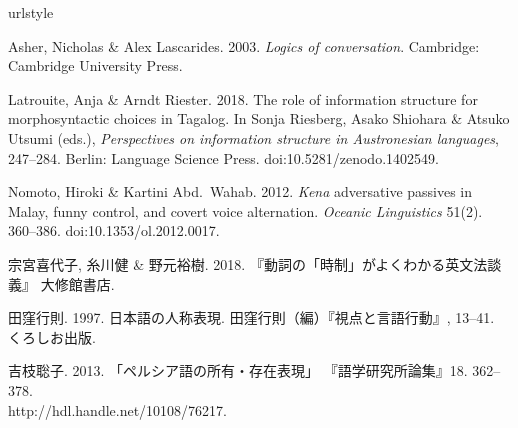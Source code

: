 \documentclass{goken}
\begin{document}
\begin{thebibliography}{6}
\providecommand{\natexlab}[1]{#1}
\providecommand{\url}[1]{#1}
\providecommand{\urlprefix}{}
\expandafter\ifx\csname urlstyle\endcsname\relax
  \providecommand{\doi}[1]{doi:\discretionary{}{}{}#1}\else
  \providecommand{\doi}{doi:\discretionary{}{}{}\begingroup
  \urlstyle{rm}\Url}\fi

Asher, Nicholas \& Alex Lascarides. 2003.
\newblock \emph{Logics of conversation}.
\newblock Cambridge: Cambridge University Press.

Latrouite, Anja \& Arndt Riester. 2018.
\newblock The role of information structure for morphosyntactic choices in
  {Tagalog}.
\newblock In Sonja Riesberg, Asako Shiohara \& Atsuko Utsumi (eds.),
  \emph{Perspectives on information structure in {Austronesian} languages},
  247--284. Berlin: Language Science Press.
\newblock \doi{10.5281/zenodo.1402549}.

Nomoto, Hiroki \& Kartini Abd.~Wahab. 2012.
\newblock \textit{Kena} adversative passives in {M}alay, funny control, and
  covert voice alternation.
\newblock \emph{Oceanic Linguistics} 51(2). 360--386.
\newblock \doi{10.1353/ol.2012.0017}.

宗宮喜代子, 糸川健 \& 野元裕樹. 2018.
\newblock 『動詞の「時制」がよくわかる英文法談義』
\newblock 大修館書店.

田窪行則. 1997.
\newblock 日本語の人称表現.
\newblock 田窪行則（編）『視点と言語行動』, 13--41. くろしお出版.

吉枝聡子. 2013.
\newblock 「ペルシア語の所有・存在表現」
\newblock 『語学研究所論集』18. 362--378.\\
  \urlprefix\url{http://hdl.handle.net/10108/76217}.

\end{thebibliography}
\metainfo
\end{document}
